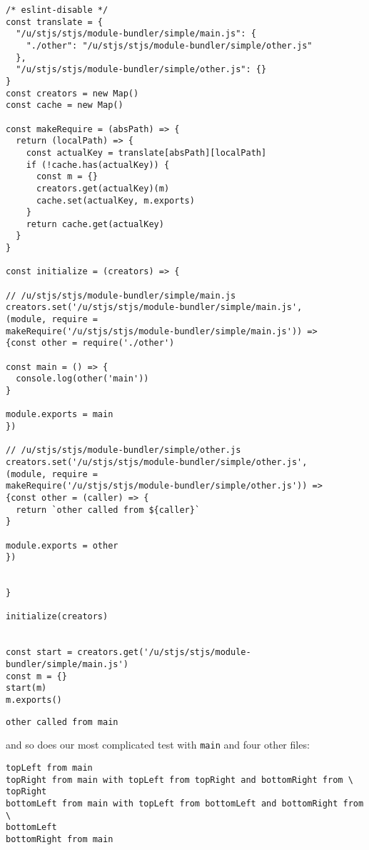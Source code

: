 \documentclass[krantzl]{krantz}
\begin{document}
\begin{lstlisting}[frame=single,frameround=tttt]
/* eslint-disable */
const translate = {
  "/u/stjs/stjs/module-bundler/simple/main.js": {
    "./other": "/u/stjs/stjs/module-bundler/simple/other.js"
  },
  "/u/stjs/stjs/module-bundler/simple/other.js": {}
}
const creators = new Map()
const cache = new Map()

const makeRequire = (absPath) => {
  return (localPath) => {
    const actualKey = translate[absPath][localPath]
    if (!cache.has(actualKey)) {
      const m = {}
      creators.get(actualKey)(m)
      cache.set(actualKey, m.exports)
    }
    return cache.get(actualKey)
  }
}

const initialize = (creators) => {

// /u/stjs/stjs/module-bundler/simple/main.js
creators.set('/u/stjs/stjs/module-bundler/simple/main.js',
(module, require =
makeRequire('/u/stjs/stjs/module-bundler/simple/main.js')) =>
{const other = require('./other')

const main = () => {
  console.log(other('main'))
}

module.exports = main
})

// /u/stjs/stjs/module-bundler/simple/other.js
creators.set('/u/stjs/stjs/module-bundler/simple/other.js',
(module, require =
makeRequire('/u/stjs/stjs/module-bundler/simple/other.js')) =>
{const other = (caller) => {
  return `other called from ${caller}`
}

module.exports = other
})


}

initialize(creators)


const start = creators.get('/u/stjs/stjs/module-bundler/simple/main.js')
const m = {}
start(m)
m.exports()
\end{lstlisting}



\begin{lstlisting}[frame=single,frameround=tttt]
other called from main
\end{lstlisting}



\noindent and so does our most complicated test with \texttt{main} and four other files:


\begin{lstlisting}[frame=single,frameround=tttt]
topLeft from main
topRight from main with topLeft from topRight and bottomRight from \
topRight
bottomLeft from main with topLeft from bottomLeft and bottomRight from \
bottomLeft
bottomRight from main
\end{lstlisting}
\end{document}

